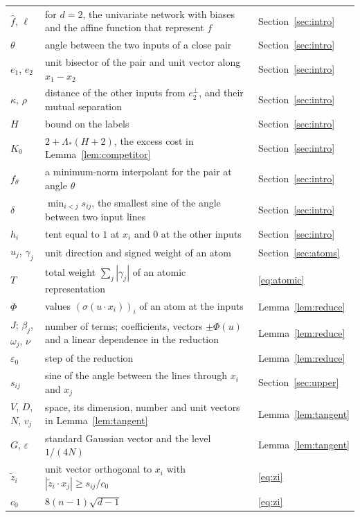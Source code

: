 \begin{longtable}{@{}lp{}p{}@{}}
$\hat f$, $\ell$ & for $d=2$, the univariate network with biases and the affine function that represent $f$ & Section~\ref{sec:intro}\\
$\theta$ & angle between the two inputs of a close pair & Section~\ref{sec:intro}\\
$e_1$, $e_2$ & unit bisector of the pair and unit vector along $x_1-x_2$ & Section~\ref{sec:intro}\\
$\kappa$, $\rho$ & distance of the other inputs from $e_2^\perp$, and their mutual separation & Section~\ref{sec:intro}\\
$H$ & bound on the labels & Section~\ref{sec:intro}\\
$K_0$ & $2+\Lambda_*(H+2)$, the excess cost in Lemma~\ref{lem:competitor} & Section~\ref{sec:intro}\\
$f_\theta$ & a minimum-norm interpolant for the pair at angle $\theta$ & Section~\ref{sec:intro}\\
$\delta$ & $\min_{i<j}s_{ij}$, the smallest sine of the angle between two input lines & Section~\ref{sec:intro}\\
$h_i$ & tent equal to $1$ at $x_i$ and $0$ at the other inputs & Section~\ref{sec:intro}\\
$u_j$, $\gamma_j$ & unit direction and signed weight of an atom & Section~\ref{sec:atoms}\\
$T$ & total weight $\sum_j|\gamma_j|$ of an atomic representation & \eqref{eq:atomic}\\
$\Phi$ & values $(\sigma(u\cdot x_i))_i$ of an atom at the inputs & Lemma~\ref{lem:reduce}\\
$J$; $\beta_j$, $\omega_j$, $\nu$ & number of terms; coefficients, vectors $\pm\Phi(u)$ and a linear dependence in the reduction & Lemma~\ref{lem:reduce}\\
$\varepsilon_0$ & step of the reduction & Lemma~\ref{lem:reduce}\\
$s_{ij}$ & sine of the angle between the lines through $x_i$ and $x_j$ & Section~\ref{sec:upper}\\
$V$, $D$, $N$, $v_j$ & space, its dimension, number and unit vectors in Lemma~\ref{lem:tangent} & Lemma~\ref{lem:tangent}\\
$G$, $\varepsilon$ & standard Gaussian vector and the level $1/(4N)$ & Lemma~\ref{lem:tangent}\\
$\tilde z_i$ & unit vector orthogonal to $x_i$ with $|\tilde z_i\cdot x_j|\ge s_{ij}/c_0$ & \eqref{eq:zi}\\
$c_0$ & $8(n-1)\sqrt{d-1}$ & \eqref{eq:zi}\\

\end{longtable}
